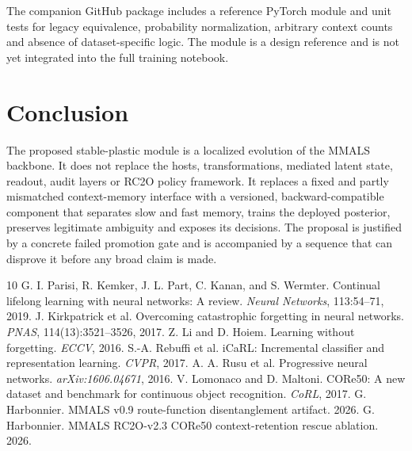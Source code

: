 \documentclass[10pt]{article}
\newcommand{\mmals}{\textsc{MMALS}}
\newcommand{\rc}{\textsc{RC2O}}
\begin{document}
The companion GitHub package includes a reference PyTorch module and unit tests for legacy equivalence, probability normalization, arbitrary context counts and absence of dataset-specific logic. The module is a design reference and is not yet integrated into the full training notebook.

\section{Conclusion}
The proposed stable-plastic module is a localized evolution of the \mmals{} backbone. It does not replace the hosts, transformations, mediated latent state, readout, audit layers or \rc{} policy framework. It replaces a fixed and partly mismatched context-memory interface with a versioned, backward-compatible component that separates slow and fast memory, trains the deployed posterior, preserves legitimate ambiguity and exposes its decisions. The proposal is justified by a concrete failed promotion gate and is accompanied by a sequence that can disprove it before any broad claim is made.

\begin{thebibliography}{10}
 G. I. Parisi, R. Kemker, J. L. Part, C. Kanan, and S. Wermter. Continual lifelong learning with neural networks: A review. \emph{Neural Networks}, 113:54--71, 2019.
 J. Kirkpatrick et al. Overcoming catastrophic forgetting in neural networks. \emph{PNAS}, 114(13):3521--3526, 2017.
 Z. Li and D. Hoiem. Learning without forgetting. \emph{ECCV}, 2016.
 S.-A. Rebuffi et al. iCaRL: Incremental classifier and representation learning. \emph{CVPR}, 2017.
 A. A. Rusu et al. Progressive neural networks. \emph{arXiv:1606.04671}, 2016.
 V. Lomonaco and D. Maltoni. CORe50: A new dataset and benchmark for continuous object recognition. \emph{CoRL}, 2017.
 G. Harbonnier. MMALS v0.9 route-function disentanglement artifact. 2026.
 G. Harbonnier. MMALS RC2O-v2.3 CORe50 context-retention rescue ablation. 2026.
\end{thebibliography}
\end{document}
